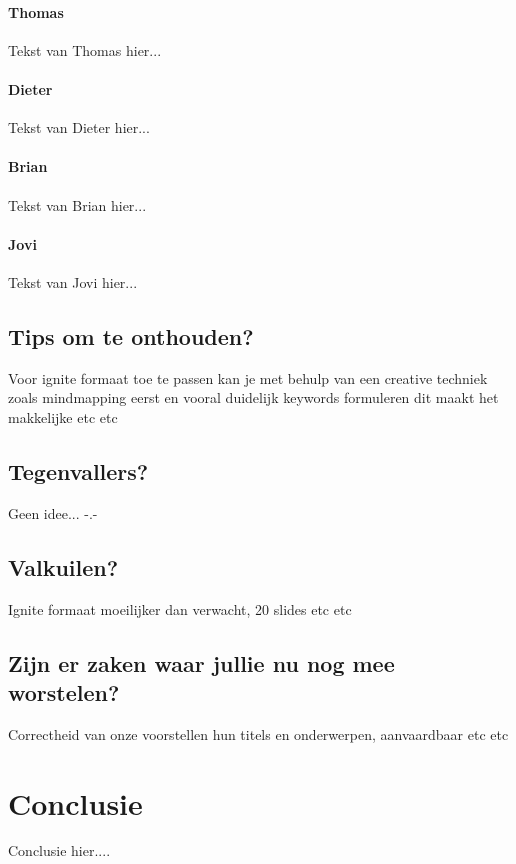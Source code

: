 \documentclass[fleqn,10pt]{voorstel}
\begin{document}
\paragraph{Thomas}
Tekst van Thomas hier...

\paragraph{Dieter}
Tekst van Dieter hier...

\paragraph{Brian}
Tekst van Brian hier...

\paragraph{Jovi}
Tekst van Jovi hier...

\subsection{Tips om te onthouden?}
Voor ignite formaat toe te passen kan je met behulp van een creative techniek zoals mindmapping eerst en vooral 
duidelijk keywords formuleren dit maakt het makkelijke etc etc

\subsection{Tegenvallers?}
Geen idee... -.-

\subsection{Valkuilen?}
Ignite formaat moeilijker dan verwacht, 20 slides etc etc

\subsection{Zijn er zaken waar jullie nu nog mee worstelen?}
Correctheid van onze voorstellen hun titels en onderwerpen, aanvaardbaar etc etc

\section{Conclusie}
Conclusie hier....
\end{document}
